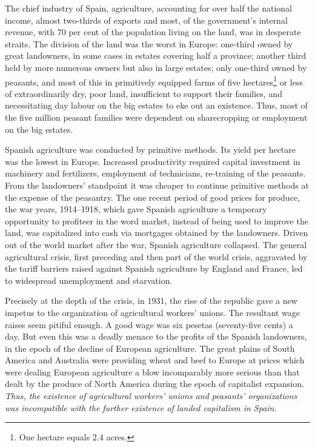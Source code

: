 The chief industry of Spain, agriculture, accounting for over half the national income, almost two-thirds of exports and most, of the government’s internal revenue, with 70 per cent of the population living on the land, was in desperate straits. The division of the land was the worst in Europe: one-third owned by great landowners, in some cases in estates covering half a province; another third held by more numerous owners but also in large estates; only one-third owned by peasants, and most of this in primitively equipped farms of five hectares\footnote{One hectare equals 2.4 acres.} or less of extraordinarily dry, poor land, insufficient to support their families, and necessitating day labour on the big estates to eke out an existence. Thus, most of the five million peasant families were dependent on sharecropping or employment on the big estates.

Spanish agriculture was conducted by primitive methods. Its yield per hectare was the lowest in Europe. Increased productivity required capital investment in machinery and fertilizers, employment of technicians, re-training of the peasants. From the landowners’ standpoint it was cheaper to continue primitive methods at the expense of the peasantry. The one recent period of good prices for produce, the war years, 1914--1918, which gave Spanish agriculture a temporary opportunity to profiteer in the word market, instead of being used to improve the land, was capitalized into cash via mortgages obtained by the landowners. Driven out of the world market after the war, Spanish agriculture collapsed. The general agricultural crisis, first preceding and then part of the world crisis, aggravated by the tariff barriers raised against Spanish agriculture by England and France, led to widespread unemployment and starvation.

Precisely at the depth of the crisis, in 1931, the rise of the republic gave a new impetus to the organization of agricultural workers’ unions. The resultant wage raises seem pitiful enough. A good wage was six pesetas (seventy-five cents) a day. But even this was a deadly menace to the profits of the Spanish landowners, in the epoch of the decline of European agriculture. The great plains of South America and Australia were providing wheat and beef to Europe at prices which were dealing European agriculture a blow incomparably more serious than that dealt by the produce of North America during the epoch of capitalist expansion. \emph{Thus, the existence of agricultural workers’ unions and peasants’ organizations was incompatible with the further existence of landed capitalism in Spain}.

